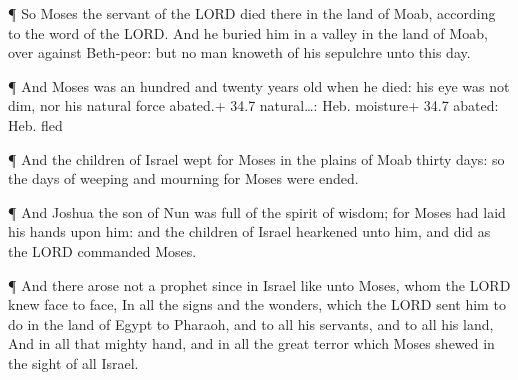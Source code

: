  ¶ So Moses the servant of the LORD died there in the land
of Moab, according to the word of the LORD.  And he buried
him in a valley in the land of Moab, over against Beth-peor: but no man
knoweth of his sepulchre unto this day.

 ¶ And Moses was an hundred and twenty years old when he
died: his eye was not dim, nor his natural force abated.+ 34.7
natural\ldots: Heb. moisture+ 34.7 abated: Heb. fled

 ¶ And the children of Israel wept for Moses in the plains
of Moab thirty days: so the days of weeping and mourning for Moses were
ended.

 ¶ And Joshua the son of Nun was full of the spirit of
wisdom; for Moses had laid his hands upon him: and the children of
Israel hearkened unto him, and did as the LORD commanded Moses.

 ¶ And there arose not a prophet since in Israel like unto
Moses, whom the LORD knew face to face,  In all the signs
and the wonders, which the LORD sent him to do in the land of Egypt to
Pharaoh, and to all his servants, and to all his land,  And
in all that mighty hand, and in all the great terror which Moses shewed
in the sight of all Israel.
